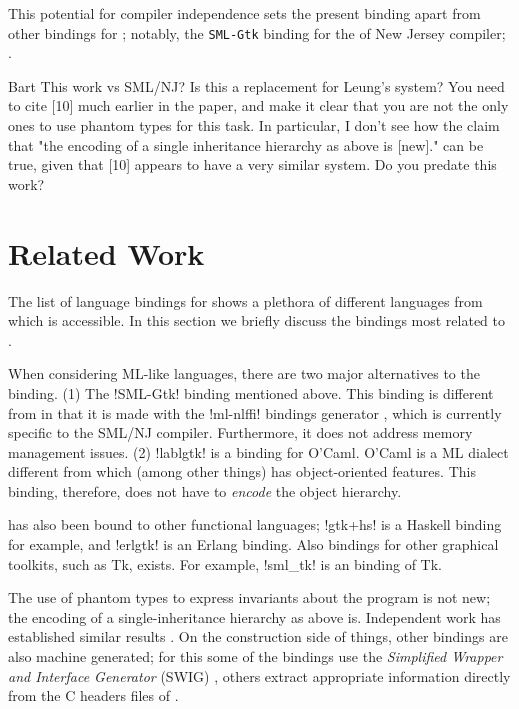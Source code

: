 \documentclass[workingdraft]{usetex-v1}
\begin{document}
This potential for compiler independence sets the present binding
apart from other \gtk bindings for \sml; notably, the \texttt{SML-Gtk}
binding for the \sml of New Jersey compiler;
\cite{SML-Gtk-webpage:2003}.

\begin{ednote}{Bart}
  This work vs SML/NJ?  Is this a replacement for Leung's
system?  You need to cite [10] much earlier in the paper,
and make it clear that you are not the only ones to use
phantom types for this task.  In particular, I don't see how
the claim that "the encoding of a single inheritance
hierarchy as above is [new]." can be true, given that [10]
appears to have a very similar system.  Do you predate this
work?

\end{ednote}


\section{Related Work}
\label{sec:related-work}

The list of language bindings for \gtk shows a plethora of different
languages from which \gtk is accessible. In this section we briefly
discuss the bindings most related to \mgtk.

When considering ML-like languages, there are two major alternatives
to the \mgtk binding. (1) The !SML-Gtk! binding mentioned above.  This
binding is different from \mgtk in that it is made with the !ml-nlffi!
bindings generator \cite{Blume:2001:nlffi}, which is currently
specific to the SML/NJ compiler.  Furthermore, it does not address
memory management issues.
%
(2) !lablgtk! is a \gtk binding for O'Caml.
O'Caml is a ML dialect different from \sml which (among other things)
has object-oriented features. This binding, therefore, does not have
to \emph{encode} the \gtk object hierarchy.

\gtk has also been bound to other functional languages;
!gtk+hs! is a Haskell binding for example,
and !erlgtk! is an Erlang binding.
%
Also bindings for other graphical toolkits, such as Tk, exists.
For example, !sml_tk! is an \sml binding of Tk.

The use of phantom types to express invariants about the program
is not new; the encoding of a single-inheritance hierarchy as
above is. Independent work has established similar results
\cite{Fluet-Pucella:2002}. %
On the construction side of things, other bindings are also machine
generated; for this some of the bindings use the \emph{Simplified
  Wrapper and Interface Generator} (SWIG) \cite{Beazley:1996}, others
extract appropriate information directly from the C headers files of
\gtk.
\end{document}
